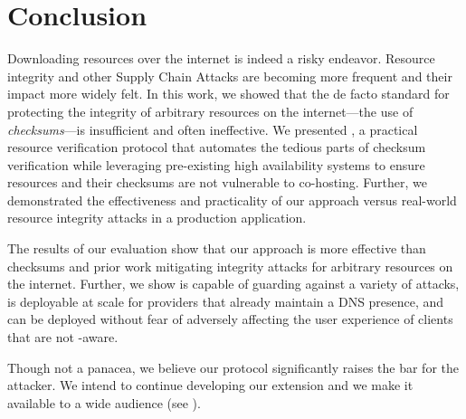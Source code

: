 \section{Conclusion} \label{sec:conclusion}

Downloading resources over the internet is indeed a risky endeavor. Resource
integrity and other Supply Chain Attacks are becoming more frequent and their
impact more widely felt. In this work, we showed that the de facto standard for
protecting the integrity of arbitrary resources on the internet---the use of
\emph{checksums}---is insufficient and often ineffective. We presented
\SYSTEM{}, a practical resource verification protocol that automates the tedious
parts of checksum verification while leveraging pre-existing high availability
systems to ensure resources and their checksums are not vulnerable to
co-hosting. Further, we demonstrated the effectiveness and practicality of our
approach versus real-world resource integrity attacks in a production
application.

The results of our evaluation show that our approach is more effective than
checksums and prior work mitigating integrity attacks for arbitrary resources on
the internet. Further, we show \SYSTEM{} is capable of guarding against a
variety of attacks, is deployable at scale for providers that already maintain a
DNS presence, and can be deployed without fear of adversely affecting the user
experience of clients that are not \SYSTEM{}-aware.

Though not a panacea, we believe our protocol significantly raises the bar for
the attacker. We intend to continue developing our extension and we make it
available to a wide audience (see ).
